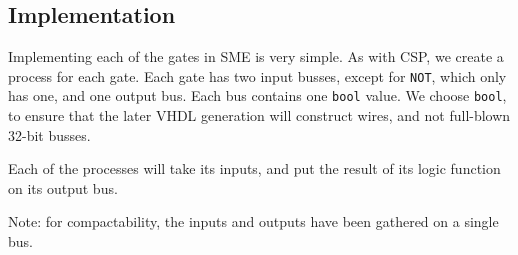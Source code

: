 \documentclass{beamer}
\renewcommand{\tt}{\texttt}
\begin{document}
\subsection{Implementation}
\begin{frame}
    Implementing each of the gates in SME is very simple. As with CSP, we
    create a process for each gate. Each gate has two input busses, except for
    \tt{NOT}, which only has one, and one output bus. Each bus contains one
    \tt{bool} value. We choose \tt{bool}, to ensure that the later VHDL
    generation will construct wires, and not full-blown 32-bit busses.

    \vspace{\baselineskip}
    Each of the processes will take its inputs, and put the result of its logic
    function on its output bus.
\end{frame}
\begin{frame}[fragile]
    
    Note: for compactability, the inputs and outputs have been gathered on a
    single bus.
\end{frame}
\begin{frame}[fragile]
    
\end{frame}
\end{document}
